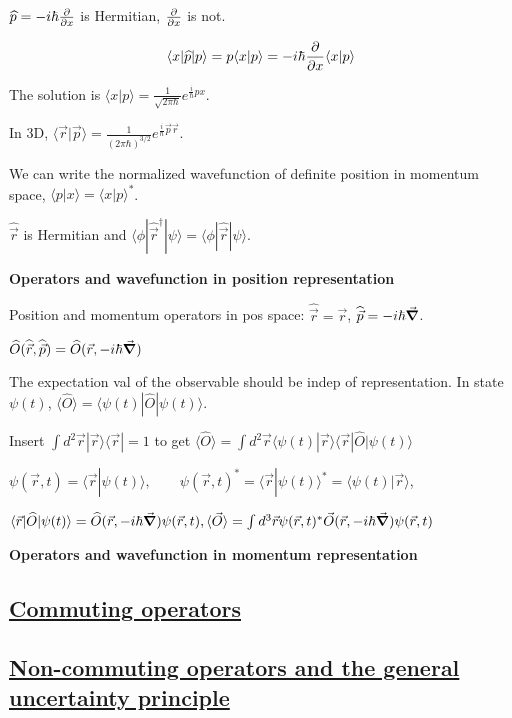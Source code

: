 $\widehat{p} = -i \hbar \pdv{}{x}$ is Hermitian, $\pdv{}{x}$ is not.

$$\langle x | \widehat{p} | p \rangle = p \langle x | p \rangle = -i \hbar \pdv{}{x} \langle x | p \rangle$$

The solution is $\langle x | p \rangle = \frac{1}{\sqrt{2 \pi \hbar}} e^{\frac{i}{\hbar} px}$. 

In 3D, $\langle \vec{r} | \vec{p} \rangle = \frac{1}{(2 \pi \hbar)^{3/2}} e^{\frac{i}{\hbar} \vec{p} \vec{r}}$.

We can write the normalized wavefunction of definite position in momentum space, $\langle p | x \rangle = \langle x | p \rangle^*$.

$\widehat{\vec{r}}$ is Hermitian and $\langle \phi | \widehat{\vec{r}}^{\dag} | \psi \rangle = \langle \phi | \widehat{\vec{r}} | \psi \rangle$.

\textbf{Operators and wavefunction in position representation}

Position and momentum operators in pos space: $\widehat{\vec{r}} = \vec{r}$, $\widehat{\vec{p}} = -i \hbar \vec{\grad}$.

$\widehat{O}(\widehat{\vec{r}}, \widehat{\vec{p}}) = \widehat{O} (\vec{r}, -i \hbar \vec{\grad})$

The expectation val of the observable should be indep of representation. In state $\psi(t)$, $\langle \widehat{O} \rangle = \langle \psi(t) | \widehat{O} | \psi(t) \rangle$.

Insert $\int d^2 \vec{r} | \vec{r} \rangle \langle \vec{r} | = 1$ to get $\langle \widehat{O} \rangle = \int d^2 \vec{r} \langle \psi(t) | \vec{r} \rangle \langle \vec{r} | \widehat{O} | \psi(t) \rangle$

$\psi(\vec{r}, t) = \langle \vec{r} | \psi(t) \rangle, \qquad \psi(\vec{r}, t)^* = \langle \vec{r} | \psi(t) \rangle^* = \langle \psi(t) | \vec{r} \rangle$,

$\langle \vec{r} | \widehat{O} | \psi(t) \rangle = \widehat{O} (\vec{r}, -i \hbar \vec{\grad}) \psi(\vec{r}, t), \langle \vec{O} \rangle = \int d^3 \vec{r} \psi(\vec{r}, t)^* \vec{O}(\vec{r}, -i \hbar \vec{\grad}) \psi(\vec{r}, t)$

\textbf{Operators and wavefunction in momentum representation}

\subsection{\underline{Commuting operators}}


\subsection{\underline{Non-commuting operators and the general uncertainty principle}}

